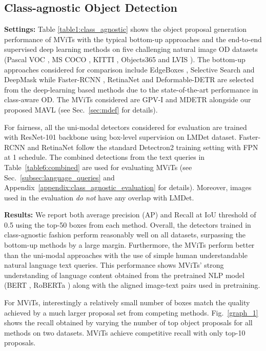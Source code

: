 \documentclass[runningheads]{llncs}
\begin{document}
\subsection{Class-agnostic Object Detection}\label{sec:class-agnostic}
\textbf{Settings:}
Table \ref{table1:class_agnostic} shows the object proposal generation performance of MViTs with the typical bottom-up approaches and the end-to-end supervised deep learning methods on five  challenging natural image OD datasets (Pascal VOC \cite{voc}, MS COCO \cite{coco}, KITTI \cite{kitti}, {Objects365 \cite{shao2019objects365} and LVIS \cite{gupta2019lvis}}). The bottom-up approaches considered for comparison include EdgeBoxes \cite{zitnick2014edge}, Selective Search \cite{uijlings2013selective} and DeepMask \cite{pinheiro2015learning} while Faster-RCNN \cite{ren2015faster}, RetinaNet \cite{lin2017focal} and Deformable-DETR \cite{zhu2020deformable} are selected from the deep-learning based methods due to the state-of-the-art performance in class-aware OD. The MViTs considered are GPV-I \cite{gpv1} and MDETR \cite{mdetr} alongside our proposed MAVL (see Sec.~\ref{sec:mdef} for details). 

For fairness, all the uni-modal detectors considered for evaluation are trained with ResNet-101 backbone using box-level supervision on {LMDet} dataset. Faster-RCNN and RetinaNet follow the standard Detectron2 \cite{wu2019detectron2} training setting with FPN at 1 schedule. {The combined detections from the text queries in Table~\ref{table6:combined} are used for evaluating MViTs (see Sec.~\ref{subsec:language_queries} and Appendix~\ref{appendix:class_agnostic_evaluation} for details).} Moreover, images used in the evaluation \emph{do not} have any overlap with LMDet.

\noindent\textbf{Results:} We report both average precision (AP) and Recall at IoU threshold of 0.5 using the top-50 boxes from each method. Overall, the detectors trained in class-agnostic fashion perform reasonably well on all datasets, surpassing the bottom-up methods by a large margin. Furthermore, the MViTs perform better than the uni-modal approaches with the use of simple human understandable natural language text queries. This performance shows MViTs' strong understanding of language content obtained from the pretrained NLP model (BERT \cite{BERT}, RoBERTa \cite{roberta}) along with the aligned image-text pairs used in pretraining.

For MViTs, interestingly a relatively small number of boxes match the quality achieved by a much larger proposal set
from competing methods. Fig.~\ref{graph_1} shows the recall
obtained by varying the number of top object proposals for all methods on two datasets. MViTs achieve competitive recall
with only top-10 proposals.
\end{document}
